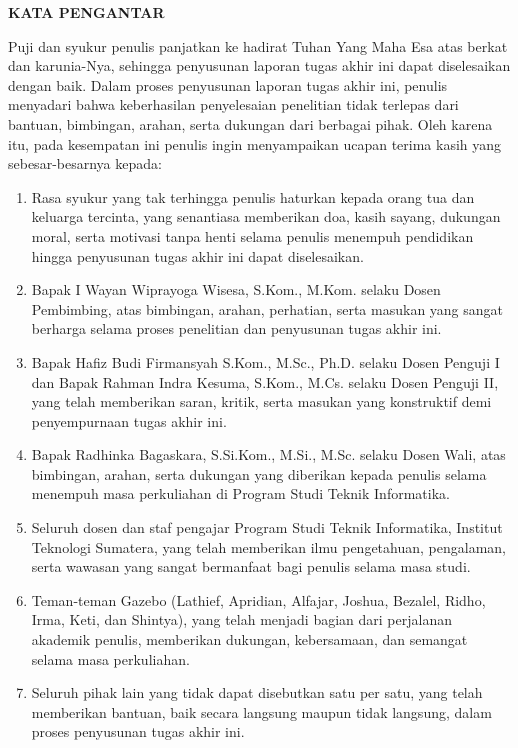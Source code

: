 \clearpage
{}%

\begin{justifying}
	\large \bfseries \centering \MakeUppercase{Kata Pengantar}\linebreak
	
	\normalsize \normalfont \justifying
	Puji dan syukur penulis panjatkan ke hadirat Tuhan Yang Maha Esa atas berkat dan karunia-Nya, sehingga penyusunan laporan tugas akhir ini dapat diselesaikan dengan baik. Dalam proses penyusunan laporan tugas akhir ini, penulis menyadari bahwa keberhasilan penyelesaian penelitian tidak terlepas dari bantuan, bimbingan, arahan, serta dukungan dari berbagai pihak. Oleh karena itu, pada kesempatan ini penulis ingin menyampaikan ucapan terima kasih yang sebesar-besarnya kepada: \par

	\begin{enumerate}
		\item Rasa syukur yang tak terhingga penulis haturkan kepada orang tua dan keluarga tercinta, yang senantiasa memberikan doa, kasih sayang, dukungan moral, serta motivasi tanpa henti selama penulis menempuh pendidikan hingga penyusunan tugas akhir ini dapat diselesaikan.
		\item Bapak I Wayan Wiprayoga Wisesa, S.Kom., M.Kom. selaku Dosen Pembimbing, atas bimbingan, arahan, perhatian, serta masukan yang sangat berharga selama proses penelitian dan penyusunan tugas akhir ini.
		\item Bapak Hafiz Budi Firmansyah S.Kom., M.Sc., Ph.D. selaku Dosen Penguji I dan Bapak Rahman Indra Kesuma, S.Kom., M.Cs. selaku Dosen Penguji II, yang telah memberikan saran, kritik, serta masukan yang konstruktif demi penyempurnaan tugas akhir ini.
		\item Bapak Radhinka Bagaskara, S.Si.Kom., M.Si., M.Sc. selaku Dosen Wali, atas bimbingan, arahan, serta dukungan yang diberikan kepada penulis selama menempuh masa perkuliahan di Program Studi Teknik Informatika.
		\item Seluruh dosen dan staf pengajar Program Studi Teknik Informatika, Institut Teknologi Sumatera, yang telah memberikan ilmu pengetahuan, pengalaman, serta wawasan yang sangat bermanfaat bagi penulis selama masa studi.
		\item Teman-teman Gazebo (Lathief, Apridian, Alfajar, Joshua, Bezalel, Ridho, Irma, Keti, dan Shintya), yang telah menjadi bagian dari perjalanan akademik penulis, memberikan dukungan, kebersamaan, dan semangat selama masa perkuliahan.
		\item Seluruh pihak lain yang tidak dapat disebutkan satu per satu, yang telah memberikan bantuan, baik secara langsung maupun tidak langsung, dalam proses penyusunan tugas akhir ini.
	\end{enumerate} \par


\end{justifying}
